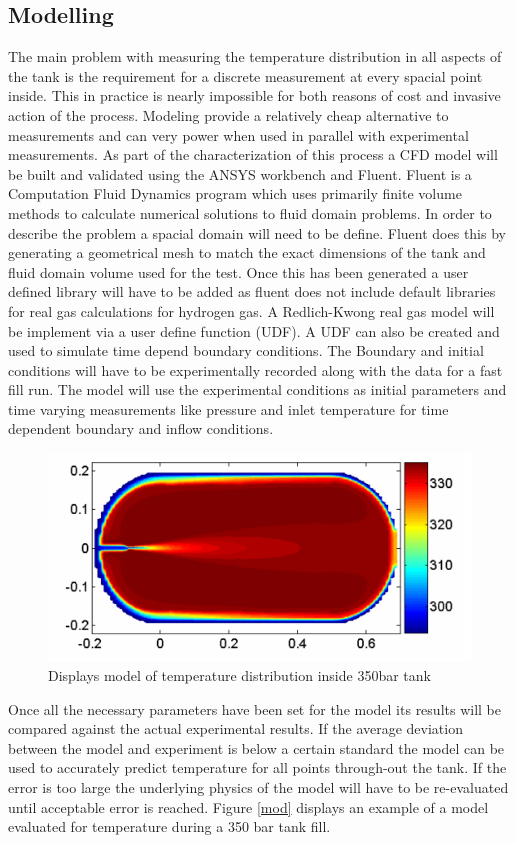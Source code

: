 \documentclass[paper=a4, fontsize=11pt, abstract=on]{scrartcl}
\numberwithin{equation}{section}		%
\numberwithin{figure}{section}			%
\numberwithin{table}{section}				%
\begin{document}
\subsection{Modelling}
The main problem with measuring the temperature distribution in all aspects of the tank is the requirement for a discrete measurement at every spacial point inside. This in practice is nearly impossible for both reasons of cost and invasive action of the process. Modeling provide a relatively cheap alternative to measurements and can very power when used in parallel with experimental measurements. As part of the characterization of this process a CFD model will be built and validated using the ANSYS workbench and Fluent. Fluent is a Computation Fluid Dynamics program which uses primarily finite volume methods to calculate numerical solutions to fluid domain problems. In order to describe the problem a spacial domain will need to be define. Fluent does this by generating a geometrical mesh to match the exact dimensions of the tank and fluid domain volume used for the test. Once this has been generated a user defined library will have to be added as fluent does not include default libraries for real gas calculations for hydrogen gas. A Redlich-Kwong real gas model will be implement via a user define function (UDF). A UDF can also be created and used to simulate time depend boundary conditions. The Boundary and initial conditions will have to be experimentally recorded along with the data for a fast fill run. The model will use the experimental conditions as initial parameters and time varying measurements like pressure and inlet temperature for time dependent boundary and inflow conditions. 
\begin{figure}[H]
\centering
\includegraphics[width=0.8\linewidth]{mod1}
\caption{Displays model of temperature distribution inside 350bar tank \cite{dick}}
\label{comp}
\end{figure}
Once all the necessary parameters have been set for the model its results will be compared against the actual experimental results. If the average deviation between the model and experiment is below a certain standard the model can be used to accurately predict temperature for all points through-out the tank. If the error is too large the underlying physics of the model will have to be re-evaluated until acceptable error is reached. Figure \ref{mod} displays an example of a model evaluated for temperature during a 350 bar tank fill.
\end{document}
